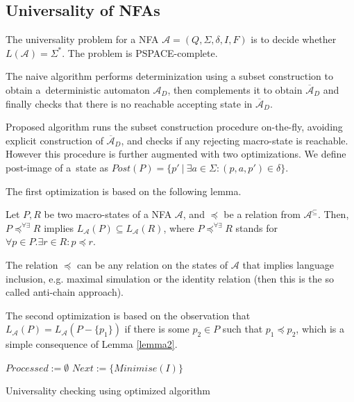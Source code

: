 \subsection{Universality of NFAs}\label{NFAuniv}

The universality problem for a NFA $\mathcal{A} = (Q, \Sigma, \delta, I, F)$ is to decide whether $L(\mathcal{A}) = \Sigma^*$. The problem is PSPACE-complete.

The naive algorithm performs determinization using a subset construction to
obtain a~deterministic automaton $\mathcal{A}_D$, then complements it to obtain $\overline{\mathcal{A}}_D$ and finally checks that there is no reachable accepting state in $\overline{\mathcal{A}}_D$.

Proposed algorithm \cite{tacas} runs the subset construction procedure on-the-fly, avoiding explicit construction of $\overline{\mathcal{A}}_D$, and checks if any rejecting macro-state is reachable. However this procedure is further augmented with two optimizations. We define post-image of a~state as $Post(P) = \{p'\ |\ \exists a \in \Sigma: (p, a, p') \in \delta\}$.

The first optimization is based on the following lemma.

\begin{lemma}\label{lemma2}
 Let $P, R$ be two macro-states of a NFA $\mathcal{A}$, and $\preceq$ be a relation from $\mathcal{A}^\subseteq$. Then, $P \preceq^{\forall\exists} R$ implies $L_\mathcal{A}(P) \subseteq L_\mathcal{A}(R)$, where $P \preceq^{\forall\exists} R$ stands for $\forall p \in P. \exists r\in R : p \preceq r$.
\end{lemma}

The relation $\preceq$ can be any relation on the states of $\mathcal{A}$ that implies language inclusion, e.g. maximal simulation or the identity relation (then this is the so called anti-chain approach).

The second optimization is based on the observation that $L_\mathcal{A}(P) = L_\mathcal{A}(P - \{p_1\})$ if there is some $p_2 \in P$ such that $p_1 \preceq  p_2$, which is a simple consequence of Lemma \ref{lemma2}.

\begin{algorithm}[hb!]
		\BlankLine
		$Processed := \emptyset$\;
		$Next := \{Minimise(I)\}$\;
		\caption{Universality checking using optimized algorithm \cite{tacas}}\label{universality}
	\end{algorithm}
	
